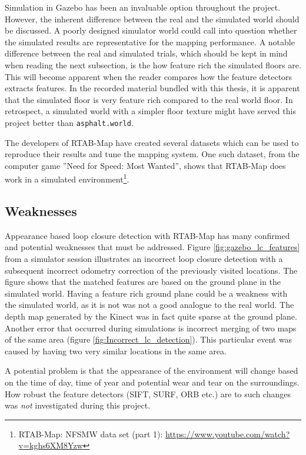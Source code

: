 Simulation in Gazebo has been an invaluable option throughout the project. However, the inherent difference between the real and the simulated world should be discussed. A poorly designed simulator world could call into question whether the simulated results are representative for the mapping performance. A notable difference between the real and simulated trials, which should be kept in mind when reading the next subsection, is the how feature rich the simulated floors are. This will become apparent when the reader compares how the feature detectors extracts features. In the recorded material bundled with this thesis, it is apparent that the simulated floor is very feature rich compared to the real world floor. In retrospect, a simulated world with a simpler floor texture might have served this project better than \texttt{asphalt.world}. 

The developers of \ac{RTAB-Map} have created several datasets which can be used to reproduce their results and tune the mapping system. One such dataset, from the computer game ''Need for Speed: Most Wanted'', shows that \ac{RTAB-Map} does work in a simulated environment\footnote{RTAB-Map: NFSMW data set (part 1): \url{https://www.youtube.com/watch?v=kghs6XM8Yzw}}. 


\subsection{Weaknesses}
\label{sec:weaknesses_mapping}
Appearance based loop closure detection with \ac{RTAB-Map} has many confirmed and potential weaknesses that must be addressed. Figure \ref{fig:gazebo_lc_features} from a simulator session illustrates an incorrect loop closure detection with a subsequent incorrect odometry correction of the previously visited locations. The figure shows that the matched features are based on the ground plane in the simulated world. Having a feature rich ground plane could be a weakness with the simulated world, as it is not was not a good analogue to the real world. The depth map generated by the Kinect was in fact quite sparse at the ground plane. Another error that occurred during simulations is incorrect merging of two maps of the same area (figure \ref{fig:Incorrect_lc_detection}). This particular event was caused by having two very similar locations in the same area. 

A potential problem is that the appearance of the environment will change based on the time of day, time of year and potential wear and tear on the surroundings. How robust the feature detectors (\ac{SIFT}, \ac{SURF}, \ac{ORB} etc.) are to such changes was \textit{not} investigated during this project.  

